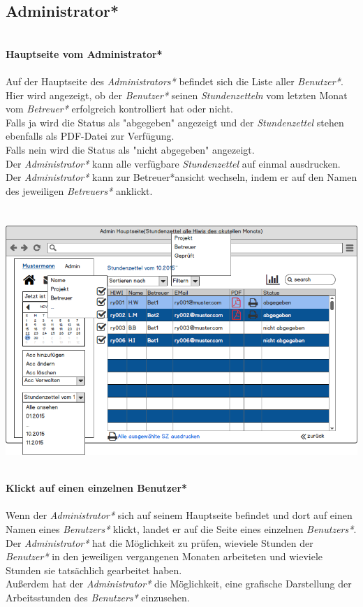 \subsection{Administrator*}
\textbf{\\Hauptseite vom Administrator*}\\
\\
Auf der Hauptseite des \emph{Administrators*} befindet sich die Liste aller \emph{Benutzer*}. Hier wird angezeigt, ob der \emph{Benutzer*} seinen \emph{Stundenzetteln} vom letzten Monat vom \emph{Betreuer*} erfolgreich kontrolliert hat oder nicht.\\
Falls ja wird die Status als "abgegeben" angezeigt und der \emph{Stundenzettel} stehen ebenfalls als PDF-Datei zur Verfügung.\\
Falls nein wird die Status als "nicht abgegeben" angezeigt.\\
Der \emph{Administrator*} kann alle verfügbare \emph{Stundenzettel} auf einmal ausdrucken.\\
Der \emph{Administrator*} kann zur Betreuer*ansicht wechseln, indem er auf den Namen des jeweiligen \emph{Betreuers*} anklickt.\\
\\
\\
\includegraphics[width=\linewidth]{UI/Admin/Hauptseite.png}

\newpage
\textbf{\\Klickt auf einen einzelnen Benutzer*}\\
\\
Wenn der \emph{Administrator*} sich auf seinem Hauptseite befindet und dort auf einen Namen eines \emph{Benutzers*} klickt, landet er auf die Seite eines einzelnen \emph{Benutzers*}.\\
Der \emph{Administrator*} hat die Möglichkeit zu prüfen, wieviele Stunden  der \emph{Benutzer*} in den jeweiligen vergangenen Monaten arbeiteten und wieviele Stunden sie tatsächlich gearbeitet haben.\\
Außerdem hat der \emph{Administrator*} die Möglichkeit, eine grafische Darstellung der Arbeitsstunden des \emph{Benutzers*} einzusehen.\\
\\
\\

